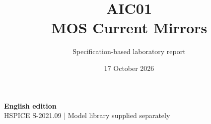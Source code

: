 \documentclass[11pt,a4paper]{article}
\title{\color{accent}AIC01\\[4pt]MOS Current Mirrors}
\author{Specification-based laboratory report}
\date{17 October 2026}
\begin{document}
\maketitle
\begin{center}\small\textbf{English edition}\\
HSPICE S-2021.09 \quad | \quad Model library supplied separately
\end{center}


\end{document}
